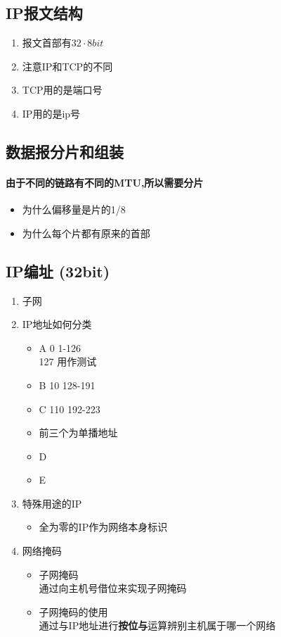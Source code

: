 \documentclass[UTF8]{article}
\begin{document}
 \subsection{IP报文结构}%
 \begin{enumerate}
   \item 报文首部有$32\cdot 8 bit$
   \item 注意IP和TCP的不同
   \item TCP用的是端口号
   \item IP用的是ip号
 \end{enumerate}
 
 \subsection{数据报分片和组装}%
 \label{sub:数据报分片和组装}
 
 \paragraph{由于不同的链路有不同的MTU,所以需要分片}%
 \label{par:由于不同的链路有不同的mtu}
 \begin{itemize}
   \item 为什么偏移量是片的1/8
   \item 为什么每个片都有原来的首部
 \end{itemize}

 \subsection{IP编址 (32bit)}%
 \label{sub:ip编址}

 \begin{enumerate}
   \item 子网
   \item IP地址如何分类
   \begin{itemize}
     \item A 0 1-126\\
     127 用作测试
     \item B 10 128-191
     \item C 110 192-223
     \item 前三个为单播地址
     \item D
     \item E
   \end{itemize}
   \item 特殊用途的IP
   \begin{itemize}
     \item 全为零的IP作为网络本身标识
   \end{itemize}
   \item 网络掩码
   \begin{itemize}
     \item 子网掩码\\
     通过向主机号借位来实现子网掩码
     \item 子网掩码的使用\\
     通过与IP地址进行\textbf{按位与}运算辨别主机属于哪一个网络
   \end{itemize}
 \end{enumerate}
\end{document}
